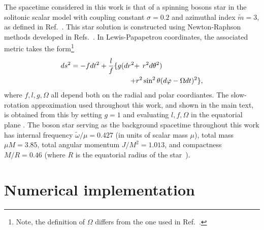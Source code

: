 \documentclass[aps,prl,notitlepage,superscriptaddress,twocolumn]{revtex4-1}
\begin{document}
The spacetime considered in this work is that of a spinning bosons star in the solitonic scalar model with coupling constant $\sigma=0.2$ and azimuthal index $\tilde{m}=3$, as defined in Ref.~\cite{Siemonsen:2025wib}. This star solution is constructed using Newton-Raphson methods developed in Refs.~\cite{Kleihaus:2005me,Siemonsen:2020hcg}. In Lewis-Papapetrou coordinates, the associated metric takes the form\footnote{Note, the definition of $\Omega$ differs from the one used in Ref.~\cite{Siemonsen:2020hcg}.}
\begin{align}
\begin{aligned}
ds^2=-fdt^2+\frac{l}{f}\large\{g(dr^2+ \ & r^2d\theta^2) \\
+r^2 & \sin^2\theta (d\varphi-\Omega dt)^2 \large\},
\end{aligned}
\end{align}
where $f,l,g,\Omega$ all depend both on the radial and polar coordiantes. The slow-rotation approximation used throughout this work, and shown in the main text, is obtained from this by setting $g=1$ and evaluating $l,f,\Omega$ in the equatorial plane \cite{Siemonsen:2025wib,Cardoso:2007az}. The boson star serving as the background spacetime throughout this work has internal frequency $\tilde{\omega}/\mu=0.427$ (in units of scalar mass $\mu$), total mass $\mu M=3.85$, total angular momentum $J/M^2=1.013$, and compactness $M/R=0.46$ (where $R$ is the equatorial radius of the star~\cite{Siemonsen:2020hcg}).

\section{Numerical implementation} \label{app:numerics}
\end{document}
